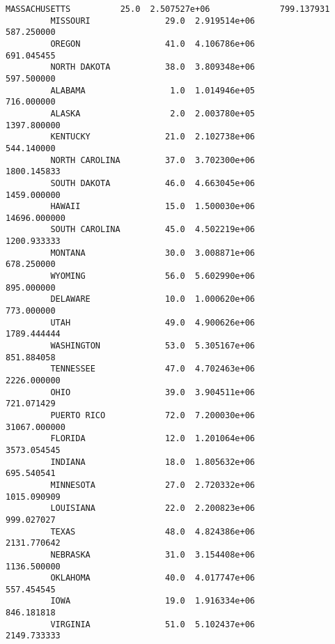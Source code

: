 \documentclass[11pt]{article}
\begin{document}
\begin{Verbatim}[commandchars=\\\{\}]
         MASSACHUSETTS          25.0  2.507527e+06              799.137931   
         MISSOURI               29.0  2.919514e+06              587.250000   
         OREGON                 41.0  4.106786e+06              691.045455   
         NORTH DAKOTA           38.0  3.809348e+06              597.500000   
         ALABAMA                 1.0  1.014946e+05              716.000000   
         ALASKA                  2.0  2.003780e+05             1397.800000   
         KENTUCKY               21.0  2.102738e+06              544.140000   
         NORTH CAROLINA         37.0  3.702300e+06             1800.145833   
         SOUTH DAKOTA           46.0  4.663045e+06             1459.000000   
         HAWAII                 15.0  1.500030e+06            14696.000000   
         SOUTH CAROLINA         45.0  4.502219e+06             1200.933333   
         MONTANA                30.0  3.008871e+06              678.250000   
         WYOMING                56.0  5.602990e+06              895.000000   
         DELAWARE               10.0  1.000620e+06              773.000000   
         UTAH                   49.0  4.900626e+06             1789.444444   
         WASHINGTON             53.0  5.305167e+06              851.884058   
         TENNESSEE              47.0  4.702463e+06             2226.000000   
         OHIO                   39.0  3.904511e+06              721.071429   
         PUERTO RICO            72.0  7.200030e+06            31067.000000   
         FLORIDA                12.0  1.201064e+06             3573.054545   
         INDIANA                18.0  1.805632e+06              695.540541   
         MINNESOTA              27.0  2.720332e+06             1015.090909   
         LOUISIANA              22.0  2.200823e+06              999.027027   
         TEXAS                  48.0  4.824386e+06             2131.770642   
         NEBRASKA               31.0  3.154408e+06             1136.500000   
         OKLAHOMA               40.0  4.017747e+06              557.454545   
         IOWA                   19.0  1.916334e+06              846.181818   
         VIRGINIA               51.0  5.102437e+06             2149.733333   
         

\end{Verbatim}
\end{document}

